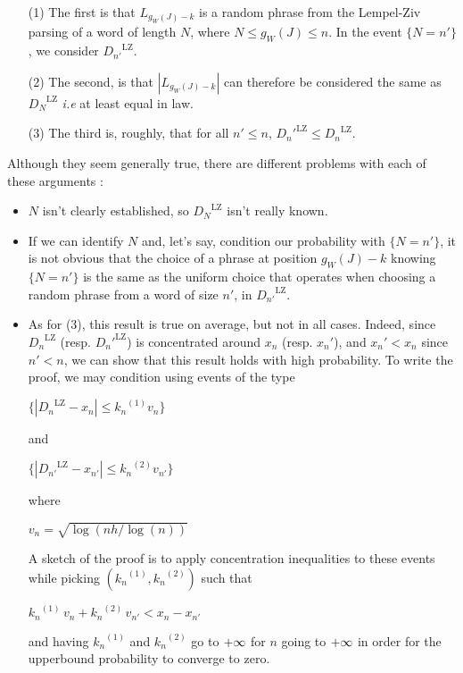 \documentclass[11pt]{article}
\newcommand{\leftcenters}[3][2]{{\raggedright #2}{\centering#3}\raggedright}
\newcommand{\tf}[2]{#1/#2}
\newcommand{\centers}[2][2]{
    \begin{center}
    {#2}\end{center}}
\newcommand{\pinf}{\tiny{+}\infty}
\begin{document}
\begin{itemize}
    \item[(1)] The first is that $L_{g_W(J)-k}$ is  
          a random phrase from the Lempel-Ziv parsing of 
          a word of length $N$, where $N \leq g_W(J) \leq n$.
          In the event $\{ N = n' \}$, we consider 
          ${D_{n'}}^{\text{LZ}}$.

    \item[(2)] The second, is that $|L_{g_W(J)-k}|$ can 
          therefore be considered the same as ${D_N}^{\text{LZ}}$
          \textit{i.e} at least equal in law.

    \item[(3)] The third is, roughly, that for all $n'\leq n$, 
        ${D_n'}^{\text{LZ}} \leq {D_n}^{\text{LZ}}$.
\end{itemize}
Although they seem generally true,
there are different problems with each of these arguments :

\begin{itemize}
    \item $N$ isn't clearly established, so 
          ${D_N}^{\text{LZ}}$ isn't really known. 

    \item If we can identify $N$ and, let's say,
          condition our probability with $\{ N = n' \}$, 
          it is not obvious
          that the choice of a phrase at position ${g_W(J)-k}$
          knowing $\{ N = n' \}$
          is the same as the uniform choice that operates
          when choosing a random phrase from a word of size
          $n'$, in ${D_{n'}}^{\text{LZ}}$.

    \item As for (3), this result is true on average, but 
          not in all cases. Indeed, since ${D_n}^{\text{LZ}}$
          (resp. ${D_n'}^{\text{LZ}}$) is concentrated
          around $x_n$ (resp. $x_n'$), and $x_n' < x_n$
          since $n' < n$, we can show 
          that this result holds with high probability.
          To write the proof, we may condition using
          events of the type

          \centers{$\{ | {D_n}^{\text{LZ}} - x_n | \leq {k_n}^{(1)} v_n \}$}

          \leftcenters
            {and}
            {$\{ | {D_{n'}}^{\text{LZ}} - x_{n'} | \leq {k_n}^{(2)} v_{n'} \} $}
          where 
          \centers{$ v_n = \sqrt{ \log( \tf{nh}{\log(n)} ) } $}
          \noindent
          A sketch of the proof is to
          apply concentration 
          inequalities to these events 
          while picking $({k_n}^{(1)}, {k_n}^{(2)})$ such that 
            \centers{$ {k_n}^{(1)} \, v_n + {k_n}^{(2)} \, v_{n'} < x_n - x_{n'} $}
          \noindent
          and having ${k_n}^{(1)}$ and ${k_n}^{(2)}$ go to $\pinf$ for 
          $n$ going to $\pinf$ in order for the upperbound probability
          to converge to zero. 
\end{itemize}
\end{document}
